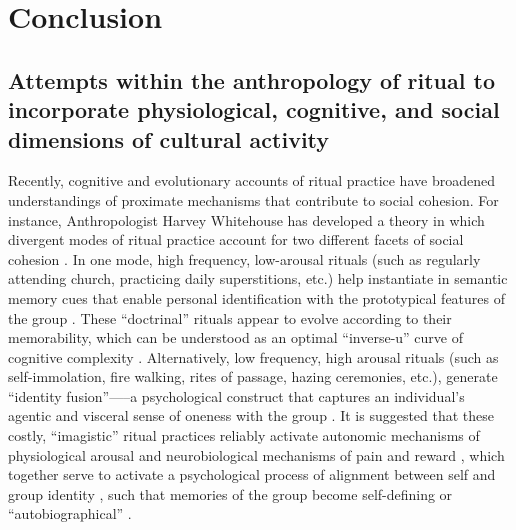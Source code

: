 








\section{Conclusion}











 \subsection{Attempts within the anthropology of ritual to incorporate physiological, cognitive, and social dimensions of cultural activity\label{sect:cogEvAnth}}

 Recently, cognitive and evolutionary accounts of ritual practice have  broadened understandings of proximate mechanisms that contribute to social cohesion.  For instance, Anthropologist Harvey Whitehouse has developed a theory in which divergent modes of ritual practice account for two different facets of social cohesion \citep[commonly known as the ``modes theory''][]{Whitehouse1996,Whitehouse2004,Whitehouse2014}.  In one mode, high frequency, low-arousal rituals (such as regularly attending church, practicing daily superstitions, etc.) help instantiate in semantic memory cues that enable personal identification with the prototypical features of the group \cite[i.e., ``group identification,'' see][]{Turner1987}. These ``doctrinal'' rituals appear to evolve according to their memorability, which can be understood as an optimal ``inverse-u'' curve of cognitive complexity \citep[][]{Whitehouse2005,Kapitany2015}.  Alternatively, low frequency, high arousal rituals (such as self-immolation, fire walking, rites of passage, hazing ceremonies, etc.), generate ``identity fusion''—--a psychological construct that captures an individual's agentic and visceral sense of oneness with the group \citep{Swann2009,Swann2015}.  It is suggested that these costly, ``imagistic'' ritual practices reliably activate autonomic mechanisms of physiological arousal \citep{Swann2010,Jackson2018} and neurobiological mechanisms of pain and reward \citep{Fischer2014a}, which together serve to activate a psychological process of alignment between self and group identity \citep{Xygalatas2013}, such that memories of the group become self-defining or ``autobiographical'' \citep[see][]{Whitehouse2014}.

